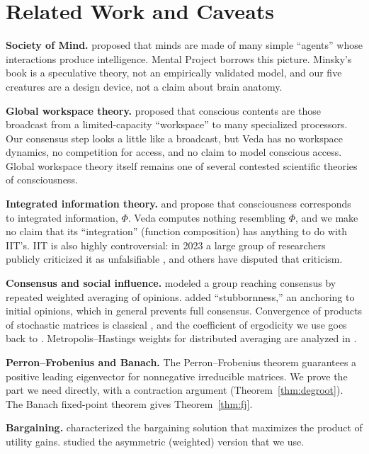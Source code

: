 \documentclass[11pt]{article}
\theoremstyle{definition}
\theoremstyle{remark}
\begin{document}
\section{Related Work and Caveats}\label{sec:related}
\textbf{Society of Mind.} \citet{minsky1986} proposed that minds are made of many simple ``agents'' whose interactions produce intelligence. Mental Project borrows this picture. Minsky's book is a speculative theory, not an empirically validated model, and our five creatures are a design device, not a claim about brain anatomy.

\textbf{Global workspace theory.} \citet{baars1988} proposed that conscious contents are those broadcast from a limited-capacity ``workspace'' to many specialized processors. Our consensus step looks a little like a broadcast, but Veda has no workspace dynamics, no competition for access, and no claim to model conscious access. Global workspace theory itself remains one of several contested scientific theories of consciousness.

\textbf{Integrated information theory.} \citet{tononi2004} and \citet{tononi2016} propose that consciousness corresponds to integrated information, $\Phi$. Veda computes nothing resembling $\Phi$, and we make no claim that its ``integration'' (function composition) has anything to do with IIT's. IIT is also highly controversial: in 2023 a large group of researchers publicly criticized it as unfalsifiable \citep{fleming2023}, and others have disputed that criticism.

\textbf{Consensus and social influence.} \citet{degroot1974} modeled a group reaching consensus by repeated weighted averaging of opinions. \citet{friedkin1990} added ``stubbornness,'' an anchoring to initial opinions, which in general prevents full consensus. Convergence of products of stochastic matrices is classical \citep{seneta2006}, and the coefficient of ergodicity we use goes back to \citet{dobrushin1956}. Metropolis--Hastings weights for distributed averaging are analyzed in \citet{xiao2004}.

\textbf{Perron--Frobenius and Banach.} The Perron--Frobenius theorem \citep{perron1907,frobenius1912} guarantees a positive leading eigenvector for nonnegative irreducible matrices. We prove the part we need directly, with a contraction argument (Theorem~\ref{thm:degroot}). The Banach fixed-point theorem \citep{banach1922} gives Theorem~\ref{thm:fj}.

\textbf{Bargaining.} \citet{nash1950} characterized the bargaining solution that maximizes the product of utility gains. \citet{kalai1977} studied the asymmetric (weighted) version that we use.
\end{document}
